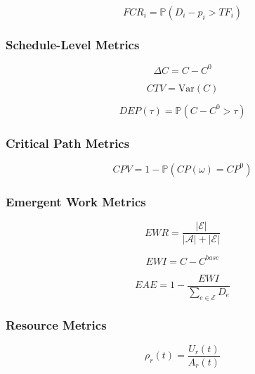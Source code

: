 \begin{equation}
FCR_i = \mathbb{P}(D_i - p_i > TF_i)
\end{equation}

\subsubsection{Schedule-Level Metrics}

\begin{equation}
\Delta C = C - C^0
\end{equation}

\begin{equation}
CTV = \mathrm{Var}(C)
\end{equation}

\begin{equation}
DEP(\tau) = \mathbb{P}(C - C^0 > \tau)
\end{equation}

\subsubsection{Critical Path Metrics}

\begin{equation}
CPV = 1 - \mathbb{P}(CP(\omega) = CP^0)
\end{equation}

\subsubsection{Emergent Work Metrics}

\begin{equation}
EWR = \frac{|\mathcal{E}|}{|\mathcal{A}| + |\mathcal{E}|}
\end{equation}

\begin{equation}
EWI = C - C^{base}
\end{equation}

\begin{equation}
EAE = 1 - \frac{EWI}{\sum_{e \in \mathcal{E}} D_e}
\end{equation}

\subsubsection{Resource Metrics}

\begin{equation}
\rho_r(t) = \frac{U_r(t)}{A_r(t)}
\end{equation}

